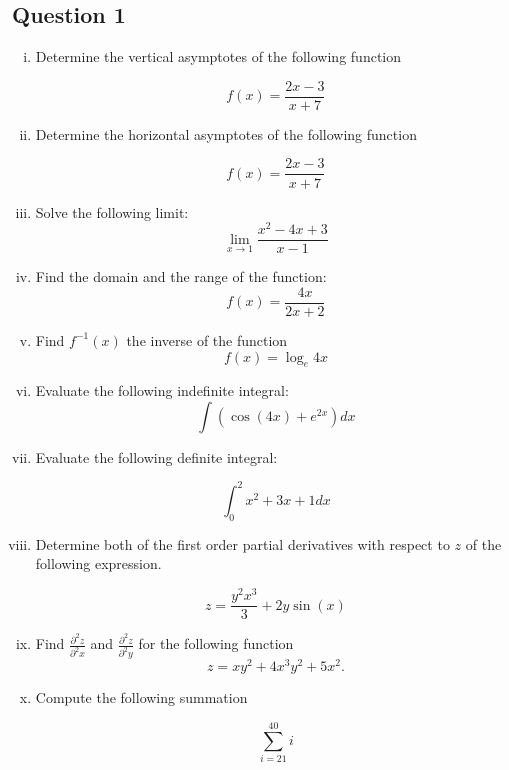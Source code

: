 \documentclass[a4paper,12pt]{article}
\begin{document}
\subsection*{Question 1}
\begin{enumerate}[(i)]
	
	\item Determine the vertical asymptotes of the following function
	
	\[  f(x)  = \frac{2x-3}{x+7} \]
	
	
	
	\item Determine the horizontal asymptotes of the following function
	
	\[  f(x)  = \frac{2x-3}{x+7} \]

	
	\item Solve the following limit:
	\[\lim_{x \to 1 } \frac{x^2-4x +3}{x-1}\]
	
	\item Find the domain and the range of the function:
	\[ f(x) = \frac{4x}{2x+2} \]

 \item Find $f^{-1}(x)$ the inverse of the function
 \[f(x) = \log_e{4x} \]
 



\item Evaluate the following indefinite integral:
\[ \int (\cos(4x)+e^{2x}) dx   \]
\item Evaluate the following definite integral:

\[  \int^{2}_{0}  x^2+3x+1 dx  \]

\item Determine both of the first order partial derivatives with respect to $z$ of the following expression.

\[ z = \frac{y^2x^3}{3} +  2y \sin(x)\]
 

\item Find $\displaystyle{ \frac{ \partial^2 z }{ \partial^2 x  }}$ and $\displaystyle{ \frac{ \partial^2 z }{ \partial^2 y }}$  for the following function
	\[ z = xy^2 + 4x^3y^2 + 5x^2.\]	

	
	

\item Compute the following summation

\[ \sum_{i=21}^{40} i \]

\end{enumerate}
\end{document}
